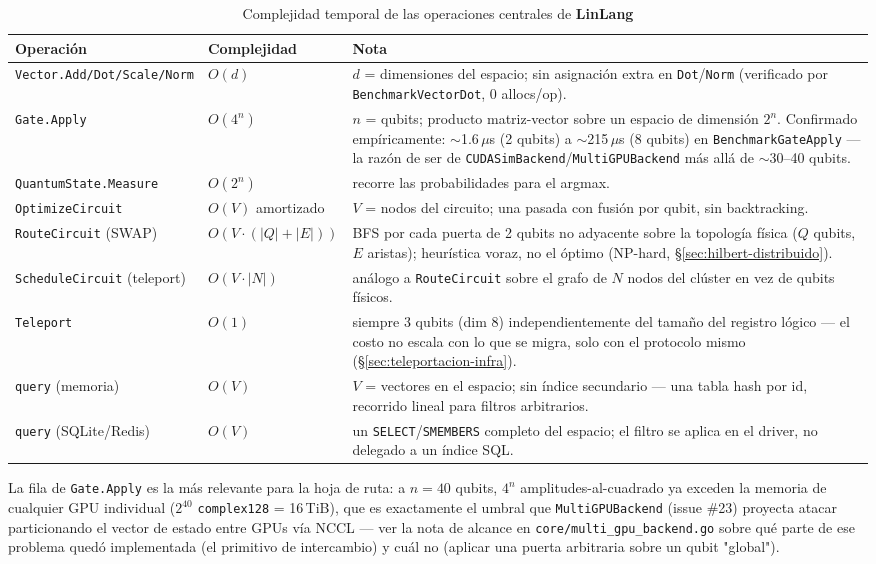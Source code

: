 \documentclass[12pt, a4paper, openany]{report}
\theoremstyle{definition}
\newcommand{\linlang}{\textbf{LinLang}}
\begin{document}
\begin{table}[H]
\centering
\caption{Complejidad temporal de las operaciones centrales de \linlang{}}
\label{tab:complejidad}
\begin{tabularx}{\linewidth}{@{}L{4.6cm}L{3.6cm}L{6.3cm}@{}}
\toprule
\textbf{Operación} & \textbf{Complejidad} & \textbf{Nota} \\
\midrule
\texttt{Vector.Add/Dot/Scale/Norm} & $O(d)$ & $d$ = dimensiones del espacio; sin asignación extra en \texttt{Dot}/\texttt{Norm} (verificado por \texttt{BenchmarkVectorDot}, 0 allocs/op). \\
\texttt{Gate.Apply} & $O(4^n)$ & $n$ = qubits; producto matriz-vector sobre un espacio de dimensión $2^n$. Confirmado empíricamente: $\sim$1.6\,$\mu$s (2 qubits) a $\sim$215\,$\mu$s (8 qubits) en \texttt{BenchmarkGateApply} — la razón de ser de \texttt{CUDASimBackend}/\texttt{MultiGPUBackend} más allá de $\sim$30--40 qubits. \\
\texttt{QuantumState.Measure} & $O(2^n)$ & recorre las probabilidades para el argmax. \\
\texttt{OptimizeCircuit} & $O(V)$ amortizado & $V$ = nodos del circuito; una pasada con fusión por qubit, sin backtracking. \\
\texttt{RouteCircuit} (SWAP) & $O(V \cdot (|Q|+|E|))$ & BFS por cada puerta de 2 qubits no adyacente sobre la topología física ($Q$ qubits, $E$ aristas); heurística voraz, no el óptimo (NP-hard, \S\ref{sec:hilbert-distribuido}). \\
\texttt{ScheduleCircuit} (teleport) & $O(V \cdot |N|)$ & análogo a \texttt{RouteCircuit} sobre el grafo de $N$ nodos del clúster en vez de qubits físicos. \\
\texttt{Teleport} & $O(1)$ & siempre 3 qubits (dim 8) independientemente del tamaño del registro lógico — el costo no escala con lo que se migra, solo con el protocolo mismo (\S\ref{sec:teleportacion-infra}). \\
\texttt{query} (memoria) & $O(V)$ & $V$ = vectores en el espacio; sin índice secundario — una tabla hash por id, recorrido lineal para filtros arbitrarios. \\
\texttt{query} (SQLite/Redis) & $O(V)$ & un \texttt{SELECT}/\texttt{SMEMBERS} completo del espacio; el filtro se aplica en el driver, no delegado a un índice SQL. \\
\bottomrule
\end{tabularx}
\end{table}

La fila de \texttt{Gate.Apply} es la más relevante para la hoja de ruta: a $n=40$ qubits, $4^n$ amplitudes-al-cuadrado ya exceden la memoria de cualquier GPU individual ($2^{40}$ \texttt{complex128} = 16\,TiB), que es exactamente el umbral que \texttt{MultiGPUBackend} (issue \#23) proyecta atacar particionando el vector de estado entre GPUs vía NCCL — ver la nota de alcance en \texttt{core/multi\_gpu\_backend.go} sobre qué parte de ese problema quedó implementada (el primitivo de intercambio) y cuál no (aplicar una puerta arbitraria sobre un qubit "global").
\end{document}
